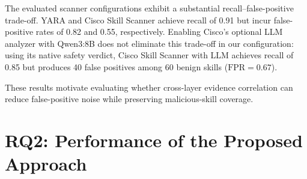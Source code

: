 \begin{tcolorbox}[colback=gray!5,colframe=gray!75!black,title=\textbf{Key Findings for RQ1}]

The evaluated scanner configurations exhibit a substantial
recall--false-positive trade-off. YARA and Cisco Skill Scanner
achieve recall of 0.91 but incur false-positive rates of 0.82 and
0.55, respectively. Enabling Cisco's optional LLM analyzer with
Qwen3:8B does not eliminate this trade-off in our configuration: using its native safety verdict, Cisco Skill Scanner with LLM achieves recall of 0.85 but produces 40 false positives
among 60 benign skills ($\mathrm{FPR}=0.67$).
 
These results motivate evaluating whether cross-layer evidence correlation can reduce false-positive noise while preserving malicious-skill coverage.



\end{tcolorbox}

\section{RQ2: Performance of the Proposed Approach}
\label{sec:rag-evaluation}

